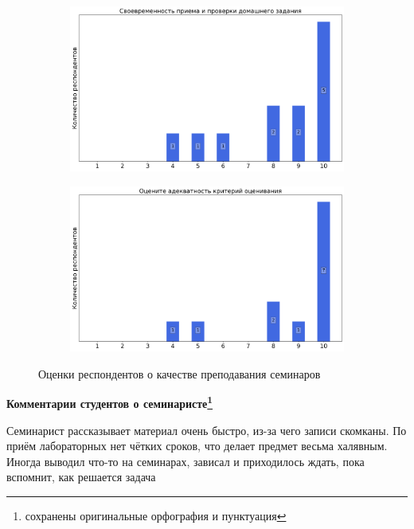 \begin{figure}[H]
\begin{subfigure}[b]{0.45\textwidth}
                \includegraphics[width=\textwidth]{images/3 course/Вычислительная математика/seminarists-marks-Шильников К.Е.-2.png}
            \end{subfigure}
            \begin{subfigure}[b]{0.45\textwidth}
                \centering
                \includegraphics[width=\textwidth]{images/3 course/Вычислительная математика/seminarists-marks-Шильников К.Е.-3.png}
            \end{subfigure}	
            \caption{Оценки респондентов о качестве преподавания семинаров}
        \end{figure}

        \textbf{Комментарии студентов о семинаристе\protect\footnote{сохранены оригинальные орфография и пунктуация}}
            \begin{commentbox} 
                Семинарист рассказывает материал очень быстро, из-за чего записи скомканы. По приём лабораторных нет чётких сроков, что делает предмет весьма халявным. Иногда выводил что-то на семинарах, зависал и приходилось ждать, пока вспомнит, как решается задача 
            \end{commentbox} 
        
